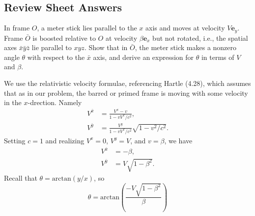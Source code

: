 \documentclass[11pt,largemargins]{homework}
\begin{document}
\maketitle
\subsection*{Review Sheet Answers}
\question
In frame $O$, a meter stick lies parallel to the $x$ axis and moves at velocity $V \mathbf{e}_y$.  Frame $\bar{O}$ is boosted relative to $O$ at velocity $\beta \mathbf{e}_x$ but not rotated, i.e., the spatial axes $\bar{x}\bar{y}\bar{z}$ lie parallel to $xyz$.  Show that in $\bar{O}$, the meter stick makes a nonzero angle $\theta$ with respect to the $\bar{x}$ axis, and derive an expression for $\theta$ in terms of $V$ and $\beta$. 

We use the relativistic velocity formulae, referencing Hartle (4.28), which assumes that as in our problem, the barred or primed frame is moving with some velocity in the $x$-drection.  Namely
\begin{subequations}
\begin{align}
V^{\bar{x}} &= \frac{V^{x} - v}{1 - v V^{x} / c^2}, \\
V^{\bar{y}} &= \frac{V^{y}}{1 - v V^{x} / c^2} \sqrt{1 - v^2 / c^2}.
\end{align}
\end{subequations}
Setting $c = 1$ and realizing $V^{x} = 0$, $V^{y} = V$, and $v = \beta$, we have
\begin{subequations}
\begin{align}
V^{\bar{x}} &= -\beta, \\
V^{\bar{y}} &= V \sqrt{1 - \beta^2}.
\end{align}
\end{subequations}
Recall that $\theta = \mathrm{arctan}(y / x)$, so 
\begin{equation}
\theta = \mathrm{arctan}(\frac{-V \sqrt{1 - \beta^2}}{\beta})
\end{equation}
\end{document}
